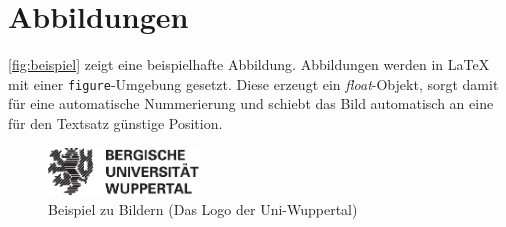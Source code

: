 	\section{Abbildungen}
		\autoref{fig:beispiel} zeigt eine beispielhafte Abbildung.
		Abbildungen werden in \LaTeX{} mit einer \lstinline[language=thesis-latexbeispiel]|figure|-Umgebung gesetzt.
		Diese erzeugt ein \emph{float}-Objekt, sorgt damit für eine automatische Nummerierung und schiebt das Bild automatisch an eine für den Textsatz günstige Position.%
		\begin{figure}[!h]
			\centering
			\includegraphics[width=4cm]{Medien/Uni_Wuppertal_Logo}
			\caption[Beispiel zu Bildern]{Beispiel zu Bildern (Das Logo der Uni-Wuppertal)}
			\label{fig:beispiel}
		\end{figure}

